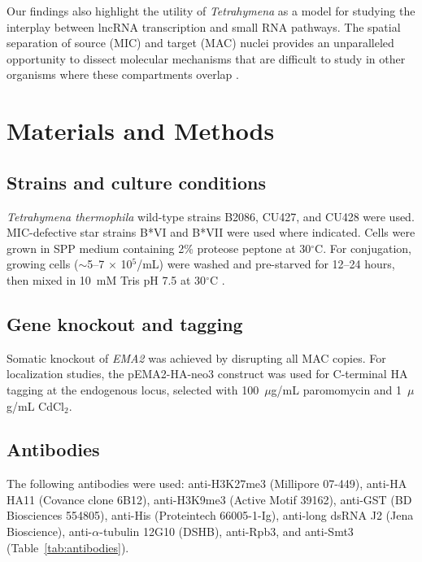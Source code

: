 \documentclass[11pt,a4paper]{article}
\begin{document}
Our findings also highlight the utility of \textit{Tetrahymena} as a model for studying the interplay between lncRNA transcription and small RNA pathways. The spatial separation of source (MIC) and target (MAC) nuclei provides an unparalleled opportunity to dissect molecular mechanisms that are difficult to study in other organisms where these compartments overlap \citep{Chalker2011, Karrer2012}.

\section{Materials and Methods}

\subsection{Strains and culture conditions}
\textit{Tetrahymena thermophila} wild-type strains B2086, CU427, and CU428 were used. MIC-defective star strains B*VI and B*VII were used where indicated. Cells were grown in SPP medium containing 2\% proteose peptone at 30$^\circ$C. For conjugation, growing cells ($\sim$5--7 $\times$ 10$^5$/mL) were washed and pre-starved for 12--24 hours, then mixed in 10~mM Tris pH 7.5 at 30$^\circ$C \citep{Miao2009}.

\subsection{Gene knockout and tagging}
Somatic knockout of \textit{EMA2} was achieved by disrupting all MAC copies. For localization studies, the pEMA2-HA-neo3 construct was used for C-terminal HA tagging at the endogenous locus, selected with 100~$\mu$g/mL paromomycin and 1~$\mu$g/mL CdCl$_2$.

\subsection{Antibodies}
The following antibodies were used: anti-H3K27me3 (Millipore 07-449), anti-HA HA11 (Covance clone 6B12), anti-H3K9me3 (Active Motif 39162), anti-GST (BD Biosciences 554805), anti-His (Proteintech 66005-1-Ig), anti-long dsRNA J2 (Jena Bioscience), anti-$\alpha$-tubulin 12G10 (DSHB), anti-Rpb3, and anti-Smt3 (Table~\ref{tab:antibodies}).
\end{document}
